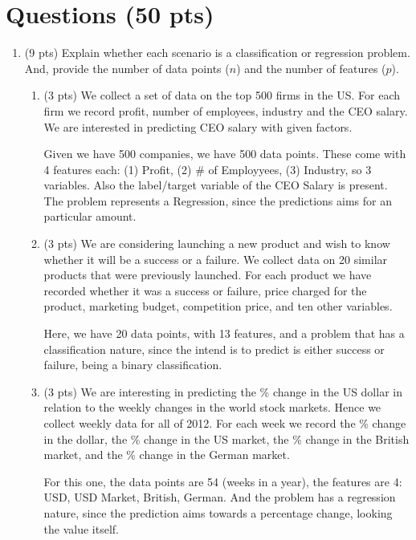 \documentclass[a4paper]{article}
\theoremstyle{definition}
\newenvironment{soln}{
    \leavevmode\color{blue}\ignorespaces
}{}
\begin{document}
\section{Questions (50 pts)}
\begin{enumerate}
\item (9 pts) Explain whether each scenario is a classification or regression problem. And, provide the number of data points ($n$) and the number of features ($p$).

\begin{enumerate}
	\item (3 pts) We collect a set of data on the top 500 firms in the US. For each firm we record profit, number of employees, industry and the CEO salary. We are interested in predicting CEO salary with given factors.
	
	\begin{soln}  Given we have 500 companies, we have 500 data points. These come with 4 features each: (1) Profit, (2) # of Employyees, (3) Industry, so 3 variables. Also the label/target variable of the CEO Salary is present. The problem represents a Regression, since the predictions aims for an particular amount. \end{soln}
	
	\item (3 pts) We are considering launching a new product and wish to know whether it will be a success or a failure. We collect data on 20 similar products that were previously launched. For each product we have recorded whether it was a success or failure, price charged for the product, marketing budget, competition price, and ten other variables.
	
	\begin{soln}  Here, we have 20 data points, with 13 features, and a problem that has a classification nature, since the intend is to predict is either success or failure, being a binary classification. \end{soln}
	
	\item (3 pts) We are interesting in predicting the \% change in the US dollar in relation to the weekly changes in the world stock markets. Hence we collect weekly data for all of 2012. For each week we record the \% change in the dollar, the \% change in the US market, the \% change in the British market, and the \% change in the German market.
	
	\begin{soln}  For this one, the data points are 54 (weeks in a year), the features are 4: USD, USD Market, British, German. And the problem has a regression nature, since the prediction aims towards a percentage change, looking the value itself. \end{soln}
	

\end{enumerate}
\end{enumerate}
\end{document}
